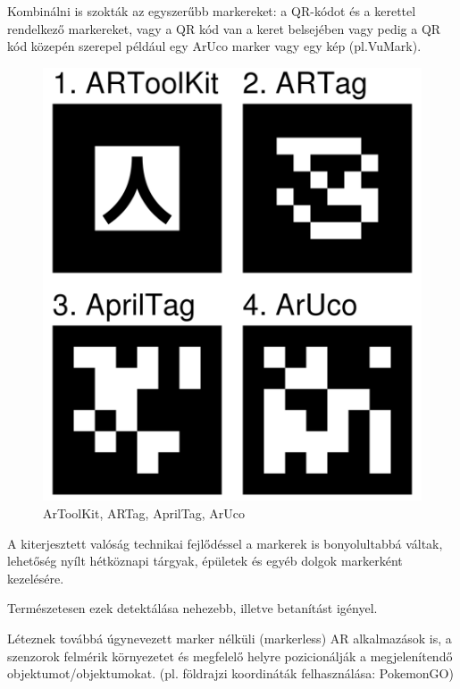 Kombinálni is szokták az egyszerűbb markereket: a QR-kódot és a kerettel rendelkező markereket, vagy a QR kód van a keret belsejében vagy pedig a QR kód közepén szerepel például egy ArUco marker vagy egy kép (pl.VuMark).

\begin{figure}[htp]
    \centering
   	\includegraphics[width=3truecm, height=3truecm]{images/markerek.png}
	\caption{ArToolKit, ARTag, AprilTag, ArUco}
\end{figure}



A kiterjesztett valóság technikai fejlődéssel a markerek is bonyolultabbá váltak, lehetőség nyílt hétköznapi tárgyak, épületek és egyéb dolgok markerként kezelésére.

Természetesen ezek detektálása nehezebb, illetve betanítást igényel.

Léteznek továbbá úgynevezett marker nélküli (markerless) AR alkalmazások is, a szenzorok felmérik környezetet és megfelelő helyre pozicionálják a megjelenítendő objektumot/objektumokat. (pl. földrajzi koordináták felhasználása: PokemonGO)

